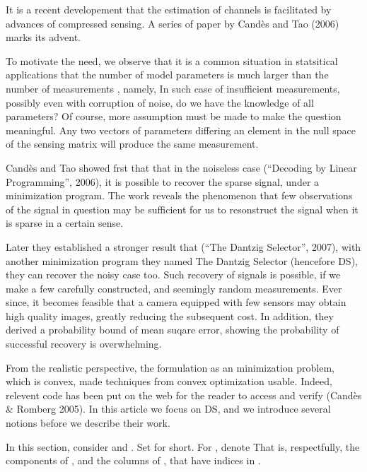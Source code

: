 \stopsection
\startsection [title={The Dantzig Selector}]

It is a recent developement that the estimation of channels is facilitated by advances of compressed sensing.
A series of paper by Cand\`es and Tao (2006) marks its advent.

To motivate the need, we observe that it is a common situation in statsitical applications that the number of model parameters  is much larger than the number of measurements , namely,
In such case of insufficient measurements, possibly even with corruption of noise, do we have the knowledge of all  parameters?
Of course, more assumption must be made to make the question meaningful.
Any two vectors of parameters differing an element in the null space of the sensing matrix will produce the same measurement.

Cand\`es and Tao showed frst that that in the noiseless case (``Decoding by Linear Programming'', 2006), it is possible to recover the sparse signal, under a  minimization program.
The work reveals the phenomenon that few observations of the signal in question may be sufficient for us to resonstruct the signal when it is sparse in a certain sense.

Later they established a stronger result that (``The Dantzig Selector'', 2007), with another  minimization program they named The Dantzig Selector (hencefore DS), they can recover the noisy case too.
Such recovery of signals is possible, if we make a few carefully constructed, and seemingly random measurements.
Ever since, it becomes feasible that a camera equipped with few sensors may obtain high quality images, greatly reducing the subsequent cost.
In addition, they derived a probability bound of mean suqare error, showing the probability of successful recovery is overwhelming.

From the realistic perspective, the formulation as an  minimization problem, which is convex, made techniques from convex optimization usable.
Indeed, relevent code has been put on the web for the reader to access and verify (Cand\`es \& Romberg 2005).
In this article we focus on DS, and we introduce several notions before we describe their work.

In this section, consider  and .
Set  for short.
For , denote
That is, respectfully, the components of , and the columns of , that have indices in .

